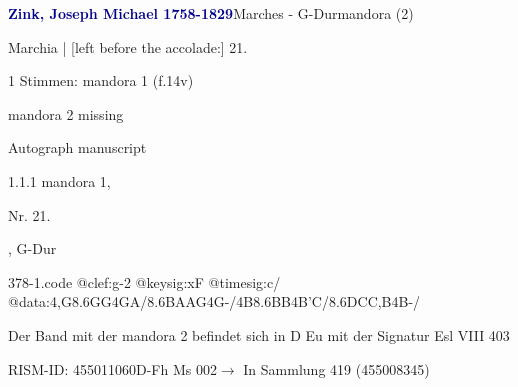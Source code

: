 \documentclass[twocolumn, 12pt]{book}
\begin{document}
\par \vspace{16pt} \textcolor{darkblue}{\textbf{Zink, Joseph Michael  1758-1829}}\hfillplus{\textbf{[378]}}\newline Marches - G-Dur\newline mandora (2)
\par \begin{itshape}[f.14v, at left:] Marchia | [left before the accolade:] 21.\end{itshape} 
\par \textcolor{darkblue}{}  1 Stimmen: mandora 1  (f.14v)\newline \begin{small} mandora 2 missing\end{small} \newline Autograph manuscript
\par 1.1.1  mandora 1, \begin{itshape}Nr. 21.\end{itshape}, G-Dur  
\begin{filecontents*}{378-1.code}
@clef:g-2
@keysig:xF
@timesig:c/
@data:4,G{8.6GG}4GA/{8.6BA}{AG}4G-/4B{8.6BB}4B'C/{8.6DC}{C,B}4B-/
\end{filecontents*}
\newline %
\par Der Band mit der mandora 2 befindet sich in D Eu mit der Signatur Esl VIII 403
\par RISM-ID: 455011060\newline D-Fh  Ms 002\newline $\rightarrow$ In Sammlung 419 (455008345)
      
\end{document}
